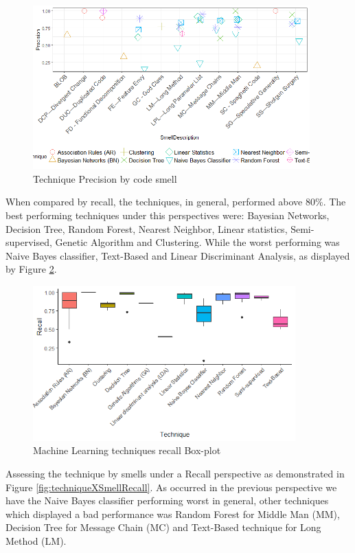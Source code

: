 \begin{figure}[!ht] 
    \centering
	\caption{Technique Precision by code smell}
	\label{fig:techniqueXSmellPrecision}
	\includegraphics[width=0.95\textwidth]{imagens/TechniqueXSmellPrecision.png}
\end{figure}

When compared by recall, the techniques, in general, performed above 80\%. The best performing techniques under this perspectives were: Bayesian Networks, Decision Tree, Random Forest, Nearest Neighbor, Linear statistics, Semi-supervised, Genetic Algorithm and Clustering. While the worst performing was Naive Bayes classifier, Text-Based and Linear Discriminant Analysis, as displayed by Figure \ref{fig:recallByTechnique}.

\begin{figure}[!ht] 
    \centering
	\caption{Machine Learning techniques recall Box-plot}
	\label{fig:recallByTechnique}
	\includegraphics[width=0.9\textwidth]{imagens/recallByTechnique.png}
\end{figure}

Assessing the technique by smells under a Recall perspective as demonstrated in Figure \ref{fig:techniqueXSmellRecall}. As occurred in the previous perspective we have the Naive Bayes classifier performing worst in general, other techniques which displayed a bad performance was Random Forest for Middle Man (MM), Decision Tree for Message Chain (MC) and Text-Based technique for Long Method (LM).

